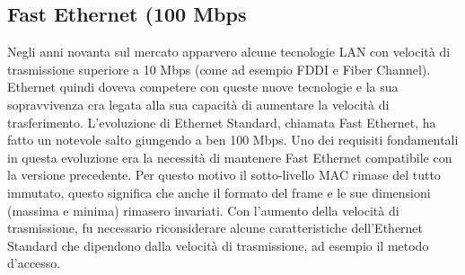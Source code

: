 \subsection{Fast Ethernet (100 Mbps}
Negli anni novanta sul mercato apparvero alcune tecnologie LAN con velocità di trasmissione superiore a 10 Mbps (come ad esempio FDDI e Fiber Channel). Ethernet quindi doveva competere con queste nuove tecnologie e la sua sopravvivenza era legata alla sua capacità di aumentare la velocità di trasferimento. L'evoluzione di Ethernet Standard, chiamata Fast Ethernet, ha fatto un notevole salto giungendo a ben 100 Mbps. Uno dei requisiti fondamentali in questa evoluzione era la necessità di mantenere Fast Ethernet compatibile con la versione precedente. Per questo motivo il sotto-livello MAC rimase del tutto immutato, questo significa che anche il formato del frame e le sue dimensioni (massima e minima) rimasero invariati. Con l'aumento della velocità di trasmissione, fu necessario riconsiderare alcune caratteristiche dell'Ethernet Standard che dipendono dalla velocità di trasmissione, ad esempio il metodo d'accesso.

